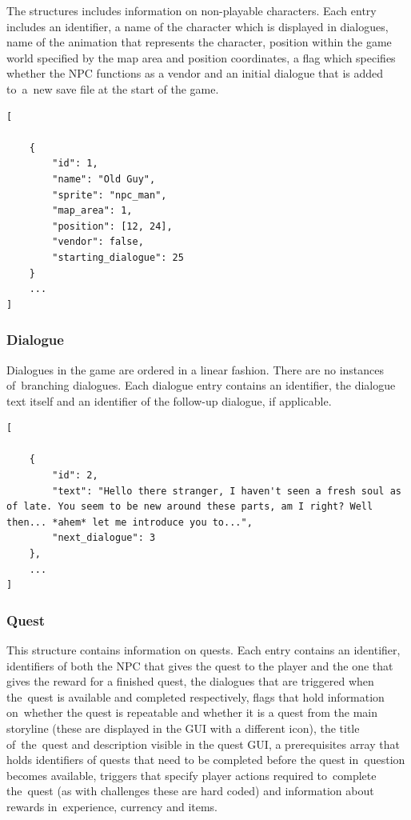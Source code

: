 \documentclass[thesis=B,english,hidelinks]{FITthesisXE}[2012/06/26]
\begin{document}
The structures includes information on non-playable characters. Each entry includes an identifier, a name of the character which is displayed in dialogues, name of the animation that represents the character, position within the game world specified by the map area and position coordinates, a flag which specifies whether the NPC functions as a vendor and an initial dialogue that is added to~a~new save file at the start of the game.

\begin{lstlisting}
[

    {
        "id": 1,
        "name": "Old Guy",
        "sprite": "npc_man",
        "map_area": 1,
        "position": [12, 24],
        "vendor": false,
        "starting_dialogue": 25
    }
    ...
]
\end{lstlisting}

\subsubsection{Dialogue}

Dialogues in the game are ordered in a linear fashion. There are no instances of~branching dialogues. Each dialogue entry contains an identifier, the dialogue text itself and an identifier of the follow-up dialogue, if applicable.

\begin{lstlisting}
[

    {
        "id": 2,
        "text": "Hello there stranger, I haven't seen a fresh soul as of late. You seem to be new around these parts, am I right? Well then... *ahem* let me introduce you to...",
        "next_dialogue": 3
    },
    ...
]
\end{lstlisting}

\subsubsection{Quest}

This structure contains information on quests. Each entry contains an identifier, identifiers of both the NPC that gives the quest to the player and the one that gives the reward for a finished quest, the dialogues that are triggered when the~quest is available and completed respectively, flags that hold information on~whether the quest is repeatable and whether it is a quest from the main storyline (these are displayed in the GUI with a different icon), the title of~the~quest and description visible in the quest GUI, a prerequisites array that holds identifiers of quests that need to be completed before the quest in~question becomes available, triggers that specify player actions required to~complete the~quest (as with challenges these are hard coded) and information about rewards in~experience, currency and items.
\end{document}
